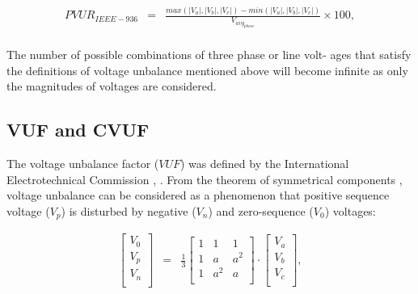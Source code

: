 \begin{equation}
        \begin{array}{rcl}
            PVUR_{IEEE-936}&=&\frac{max\left( |V_a|,|V_b|,|V_c| \right)-min\left( |V_a|,|V_b|,|V_c| \right)}{V_{avg_{phase}}}\times100,\\					
        \end{array}
        \label{BASICUNB:equ:PVUR141}
    \end{equation}
		
The number of possible combinations of three phase or line volt- ages that satisfy the definitions of voltage unbalance mentioned above will become infinite as only the magnitudes of voltages are considered.	
		
	
	\subsection{VUF and CVUF}
	
	The voltage unbalance factor ($VUF$) was defined by the International Electrotechnical Commission \cite{pillay2001definitions}, \cite{dugan1996electrical}. From the theorem of symmetrical components \cite{fortescue1918method}, voltage unbalance can be considered as a phenomenon that positive sequence voltage  ($V_p$) is disturbed by negative  ($V_n$) and zero-sequence ($V_0$) voltages:
	
	\begin{equation}
        \begin{array}{rcl}
            \begin{bmatrix}
						V_0\\
						V_p\\
						V_n\\
						\end{bmatrix}&=&
						\frac{1}{3}\begin{bmatrix}
						1&1&1\\
						1&a&a^2\\
						1&a^2&a\\
						\end{bmatrix}\cdot
						\begin{bmatrix}
						V_a\\
						V_b\\
						V_c\\
						\end{bmatrix},\\
        \end{array}
        \label{BASICUNB:equ:symmetry}
    \end{equation}
	
